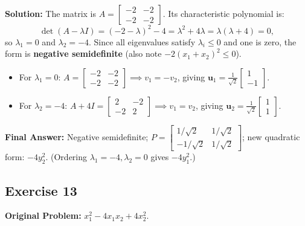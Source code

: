 \documentclass[11pt, letterpaper]{article}
\theoremstyle{definition}
\theoremstyle{remark}
\begin{document}
\textbf{Solution:}
The matrix is $A = \begin{bmatrix} -2 & -2 \\ -2 & -2 \end{bmatrix}$. Its characteristic polynomial is:
\[
\det(A - \lambda I) = (-2-\lambda)^2 - 4 = \lambda^2 + 4\lambda = \lambda(\lambda + 4) = 0,
\]
so $\lambda_1 = 0$ and $\lambda_2 = -4$. Since all eigenvalues satisfy $\lambda_i \le 0$ and one is zero, the form is \textbf{negative semidefinite} (also note $-2(x_1+x_2)^2 \le 0$).
\begin{itemize}
    \item For $\lambda_1 = 0$: $A = \begin{bmatrix} -2 & -2 \\ -2 & -2 \end{bmatrix} \implies v_1 = -v_2$, giving $\mathbf{u}_1 = \frac{1}{\sqrt{2}}\begin{bmatrix} 1 \\ -1 \end{bmatrix}$.
    \item For $\lambda_2 = -4$: $A + 4I = \begin{bmatrix} 2 & -2 \\ -2 & 2 \end{bmatrix} \implies v_1 = v_2$, giving $\mathbf{u}_2 = \frac{1}{\sqrt{2}}\begin{bmatrix} 1 \\ 1 \end{bmatrix}$.
\end{itemize}
\textbf{Final Answer:} Negative semidefinite; $P = \begin{bmatrix} 1/\sqrt{2} & 1/\sqrt{2} \\ -1/\sqrt{2} & 1/\sqrt{2} \end{bmatrix}$; new quadratic form: $-4y_2^2$. (Ordering $\lambda_1 = -4, \lambda_2 = 0$ gives $-4y_1^2$.)

\hrulefill

\subsection*{Exercise 13}
\textbf{Original Problem:} $x_1^2 - 4x_1x_2 + 4x_2^2$.
\end{document}
